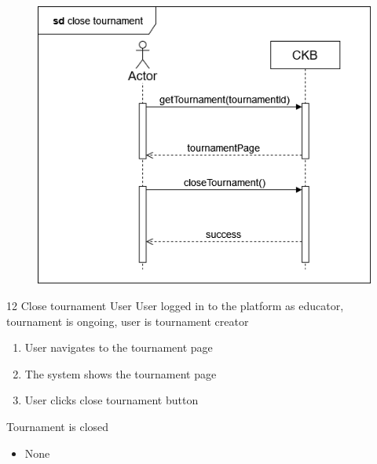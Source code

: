 \usecase
{
    \begin{figure}[H]
        \centering
        \includegraphics[width=\textwidth]{src/sequence_diagrams/closetourn.png}
    \end{figure}
}
{12}
{Close tournament} %
{User} %
{User logged in to the platform as educator, tournament is ongoing, user is tournament creator} %
{ %
    \begin{enumerate}
        \item User navigates to the tournament page
        \item The system shows the tournament page
        \item User clicks close tournament button
    \end{enumerate}
}
{Tournament is closed} %
{ %
    \begin{itemize}
        \item None
    \end{itemize}
}
{ %

}

